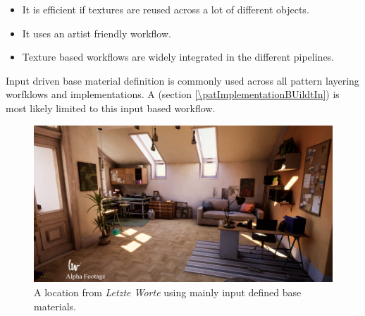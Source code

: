 \begin{description}
\begin{description}
\begin{itemize}
			\end{itemize}
		\item[\performance:]\hfill
			\begin{itemize}\mynobreakpar
				\item It is efficient if textures are reused across a lot of different objects. 
			\end{itemize}
		\item[\pipeline:]\hfill
			\begin{itemize}
				\item It uses an artist friendly workflow. 
				\item Texture based workflows are widely integrated in the different pipelines. 
			\end{itemize}
	\end{description}
	\item[\patRelations:]%
	Input driven base material definition is commonly used across all pattern layering worfklows and implementations. A \emph{\patImplementationBUildtIn} (section \ref{\patImplementationBUildtIn}) is most likely limited to this input based workflow.
\end{description}

\begin{figure}
	\centering
	\includegraphics[width=0.9\linewidth]{images/07cha_17_complexTestCase01Room.jpg}
	\caption{A location from \emph{Letzte Worte} using mainly input defined base materials.}
	\label{fig:complextestcase01room}
\end{figure}


